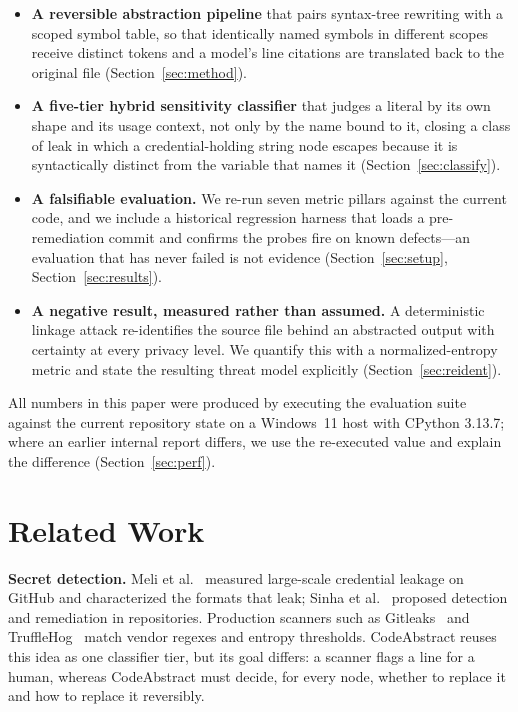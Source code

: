 \documentclass[conference]{IEEEtran}
\begin{document}
\begin{itemize}
\item \textbf{A reversible abstraction pipeline} that pairs syntax-tree
rewriting with a scoped symbol table, so that identically named symbols in
different scopes receive distinct tokens and a model's line citations are
translated back to the original file (Section~\ref{sec:method}).
\item \textbf{A five-tier hybrid sensitivity classifier} that judges a
literal by its own shape and its usage context, not only by the name bound
to it, closing a class of leak in which a credential-holding string node
escapes because it is syntactically distinct from the variable that names
it (Section~\ref{sec:classify}).
\item \textbf{A falsifiable evaluation.} We re-run seven metric pillars
against the current code, and we include a historical regression harness
that loads a pre-remediation commit and confirms the probes fire on known
defects---an evaluation that has never failed is not evidence
(Section~\ref{sec:setup}, Section~\ref{sec:results}).
\item \textbf{A negative result, measured rather than assumed.} A
deterministic linkage attack re-identifies the source file behind an
abstracted output with certainty at every privacy level. We quantify this
with a normalized-entropy metric and state the resulting threat model
explicitly (Section~\ref{sec:reident}).
\end{itemize}

All numbers in this paper were produced by executing the evaluation suite
against the current repository state on a Windows~11 host with CPython
3.13.7; where an earlier internal report differs, we use the re-executed
value and explain the difference (Section~\ref{sec:perf}).

\section{Related Work}

\textbf{Secret detection.} Meli et al.~\cite{meli2019git} measured
large-scale credential leakage on GitHub and characterized the formats
that leak; Sinha et al.~\cite{sinha2015detecting} proposed detection and
remediation in repositories. Production scanners such as
Gitleaks~\cite{gitleaks} and TruffleHog~\cite{trufflehog} match vendor
regexes and entropy thresholds. CodeAbstract reuses this idea as one
classifier tier, but its goal differs: a scanner flags a line for a human,
whereas CodeAbstract must decide, for every node, whether to replace it
and how to replace it reversibly.
\end{document}

